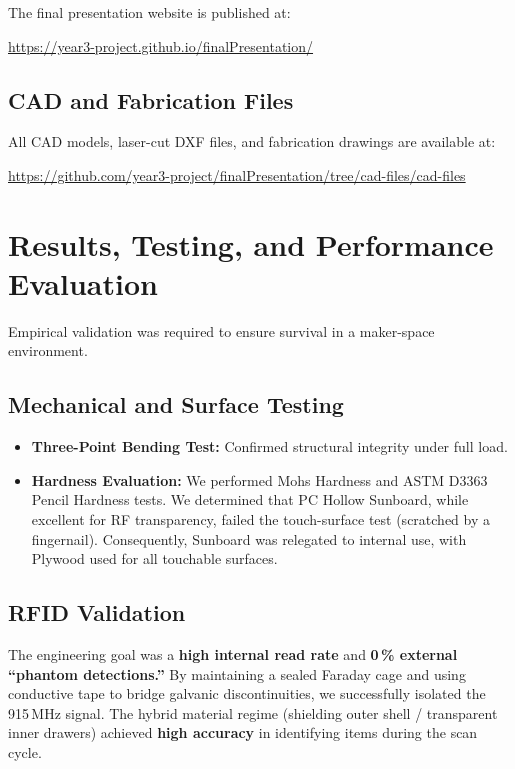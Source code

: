 \documentclass[12pt, a4paper]{article}
\begin{document}
The final presentation website is published at:

\begin{center}
  \url{https://year3-project.github.io/finalPresentation/}
\end{center}

\subsection{CAD and Fabrication Files}

All CAD models, laser-cut DXF files, and fabrication drawings are available at:

\begin{center}
  \url{https://github.com/year3-project/finalPresentation/tree/cad-files/cad-files}
\end{center}

\section{Results, Testing, and Performance Evaluation}
\label{sec:results}

Empirical validation was required to ensure survival in a maker-space environment.

\subsection{Mechanical and Surface Testing}

\begin{itemize}[nosep]
  \item \textbf{Three-Point Bending Test:} Confirmed structural integrity under full load.
  \item \textbf{Hardness Evaluation:} We performed Mohs Hardness and ASTM D3363 Pencil Hardness tests. We determined that PC Hollow Sunboard, while excellent for RF transparency, failed the touch-surface test (scratched by a fingernail). Consequently, Sunboard was relegated to internal use, with Plywood used for all touchable surfaces.
\end{itemize}

\subsection{RFID Validation}

The engineering goal was a \textbf{high internal read rate} and \textbf{0\,\% external ``phantom detections.''}
By maintaining a sealed Faraday cage and using conductive tape to bridge galvanic discontinuities, we successfully isolated the 915\,MHz signal.
The hybrid material regime (shielding outer shell / transparent inner drawers) achieved \textbf{high accuracy} in identifying items during the scan cycle.
\end{document}
